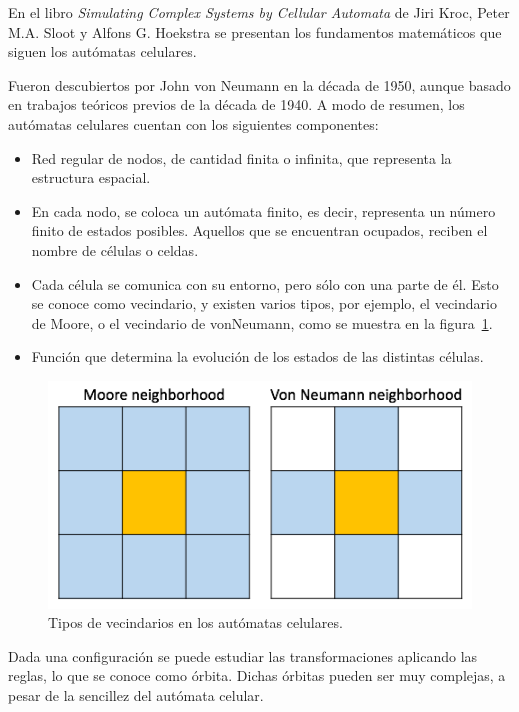 En el libro \textit{Simulating Complex Systems by Cellular Automata} de Jiri Kroc, Peter M.A. Sloot y Alfons G. Hoekstra
\cite{cellular-automata} se presentan los fundamentos matemáticos que siguen los autómatas celulares.

Fueron descubiertos por John von Neumann en la década de 1950, aunque basado en trabajos teóricos previos de la
década de 1940. A modo de resumen, los autómatas celulares cuentan con los siguientes componentes:

\begin{itemize}
    \item Red regular de nodos, de cantidad finita o infinita, que representa la estructura espacial.
    \item En cada nodo, se coloca un autómata finito, es decir, representa un número finito de estados posibles.
    Aquellos que se encuentran ocupados, reciben el nombre de células o celdas.
    \item Cada célula se comunica con su entorno, pero sólo con una parte de él. Esto se conoce como vecindario,
    y existen varios tipos, por ejemplo, el vecindario de Moore, o el vecindario de vonNeumann,
    como se muestra en la figura~\ref{fig:neighboor}.
    \item Función que determina la evolución de los estados de las distintas células.
\end{itemize}

\begin{figure}[h]
\centering
\includegraphics[scale=0.6]{figures/automata_neighboor}
\caption{Tipos de vecindarios en los autómatas celulares.}
\label{fig:neighboor}
\end{figure}

Dada una configuración se puede estudiar las transformaciones aplicando las reglas,
lo que se conoce como órbita. Dichas órbitas pueden ser muy complejas, a pesar de
la sencillez del autómata celular.

